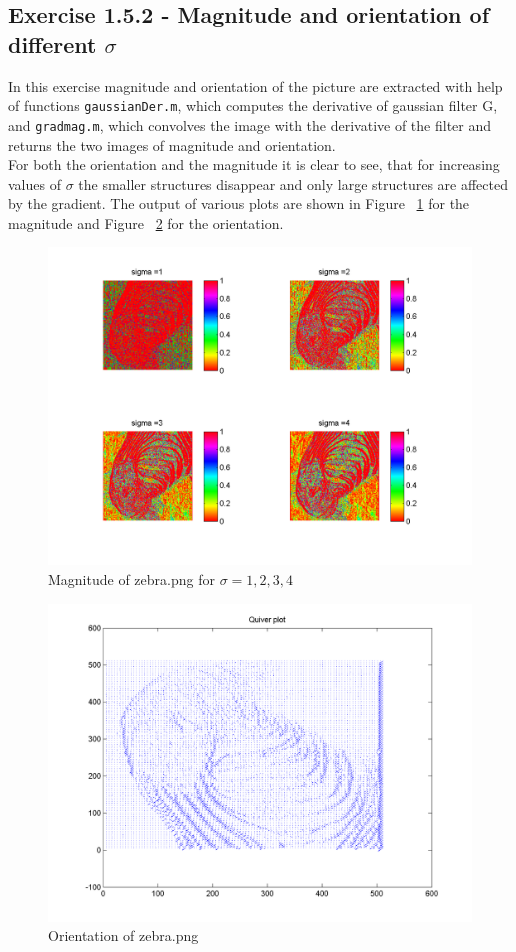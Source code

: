 \documentclass[11pt]{article}
\begin{document}
\subsection{Exercise 1.5.2 - Magnitude and orientation of different $\sigma$}
In this exercise magnitude and orientation of the picture are extracted with help of functions \texttt{gaussianDer.m}, which computes the derivative of gaussian filter G, and \texttt{gradmag.m}, which convolves the image with the derivative of the filter and returns the two images of magnitude and orientation.\\
For both the orientation and the magnitude it is clear to see, that for increasing values of $\sigma$ the smaller structures disappear and only large structures are affected by the gradient. The output of various plots are shown in Figure ~\ref{magnitude} for the magnitude and Figure ~\ref{quiv} for the orientation.
\begin{figure}[h!]
\includegraphics[scale=0.6]{magnitude.png}
\caption{Magnitude of zebra.png for $\sigma = {1,2,3,4}$}
\label{magnitude}
\end{figure}

\begin{figure}[h!]
\includegraphics[scale=0.6]{quiv.png}
\caption{Orientation of zebra.png}
\label{quiv}
\end{figure}
\end{document}
